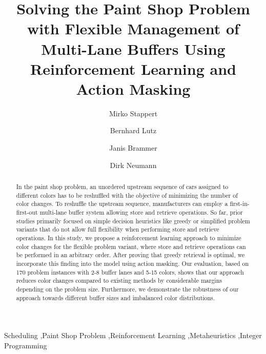 \documentclass[11pt]{elsarticle}
\begin{document}
	\begin{frontmatter}
	
		
		\title{Solving the Paint Shop Problem with Flexible Management of Multi-Lane Buffers Using Reinforcement Learning and Action Masking}
		
		\author[Freiburg]{Mirko Stappert}
		\author[Freiburg,Wien]{Bernhard Lutz}
		\author[VW]{Janis Brammer}
		\author[Freiburg]{Dirk Neumann}
		\address[Freiburg]{University of Freiburg, Rempartstr.~16, 79098 Freiburg, Germany}
		\address[Wien]{University of Vienna, Währinger Str.~29, 1090 Vienna, Austria}
		\address[VW]{CARIAD SE, Berliner Ring 2, 38440 Wolfsburg, Germany}
		
		
\begin{abstract}
In the paint shop problem, an unordered upstream sequence of cars assigned to different colors has to be reshuffled with the objective of minimizing the number of color changes. To reshuffle the upstream sequence, manufacturers can employ a first-in-first-out multi-lane buffer system allowing store and retrieve operations. So far, prior studies primarily focused on simple decision heuristics like greedy or simplified problem variants that do not allow full flexibility when performing store and retrieve operations. In this study, we propose a reinforcement learning approach to minimize color changes for the flexible problem variant, where store and retrieve operations can be performed in an arbitrary order. After proving that greedy retrieval is optimal, we incorporate this finding into the model using action masking. Our evaluation, based on 170 problem instances with 2-8 buffer lanes and 5-15 colors, shows that our approach reduces color changes compared to existing methods by considerable margins depending on the problem size. Furthermore, we demonstrate the robustness of our approach towards different buffer sizes and imbalanced color distributions.
\end{abstract}


\begin{keyword}
Scheduling \sep Paint Shop Problem \sep Reinforcement Learning \sep Metaheuristics  \sep Integer Programming
\end{keyword}
\end{frontmatter}

\onehalfspacing
\end{document}
